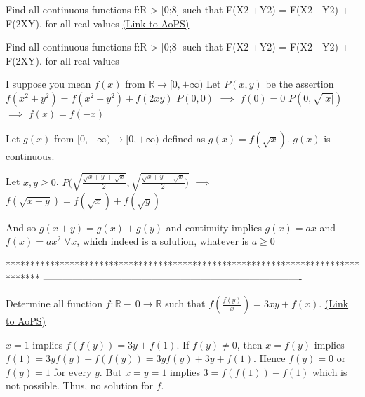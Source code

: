 \begin{problem}
	Find all continuous functions f:R-> [0;8] such that  F(X2 +Y2) = F(X2 - Y2) + F(2XY). for all real values
	\flushright \href{https://artofproblemsolving.com/community/c6h611110}{(Link to AoPS)}
\end{problem}



\begin{solution}
	\begin{tcolorbox}Find all continuous functions f:R-> [0;8] such that  F(X2 +Y2) = F(X2 - Y2) + F(2XY). for all real values\end{tcolorbox}
I suppose you mean $f(x)$ from $\mathbb R\to[0,+\infty)$
Let $P(x,y)$ be the assertion $f(x^2+y^2)=f(x^2-y^2)+f(2xy)$
$P(0,0)$ $\implies$ $f(0)=0$
$P(0,\sqrt{|x|})$ $\implies$ $f(x)=f(-x)$

Let $g(x)$ from $[0,+\infty)\to[0,+\infty)$ defined as $g(x)=f(\sqrt x)$. $g(x)$ is continuous.

Let $x,y\ge 0$. $P(\sqrt{\frac{\sqrt{x+y}+\sqrt x}2},\sqrt{\frac{\sqrt{x+y}-\sqrt x}2)}$ $\implies$ $f(\sqrt{x+y})=f(\sqrt x)+f(\sqrt y)$

And so $g(x+y)=g(x)+g(y)$ and continuity implies $g(x)=ax$ and $\boxed{f(x)=ax^2}$ $\forall x$, which indeed is a solution, whatever is $a\ge 0$
\end{solution}
*******************************************************************************
-------------------------------------------------------------------------------

\begin{problem}
	Determine all function ${f: \mathbb{R}-\ 0}\to\mathbb{R}$ such that $f(\frac{f(y)}{x})=3xy+f(x)$.
	\flushright \href{https://artofproblemsolving.com/community/c6h611482}{(Link to AoPS)}
\end{problem}



\begin{solution}
	$x=1$ implies $f(f(y))=3y+f(1)$.
If $f(y) \ne 0$, then $x=f(y)$ implies $f(1)=3yf(y)+f(f(y))=3yf(y)+3y+f(1)$. Hence $f(y)=0$ or $f(y)=1$ for every $y$.
But $x=y=1$ implies $3=f(f(1))-f(1)$ which is not possible. Thus, no solution for $f$.
\end{solution}



